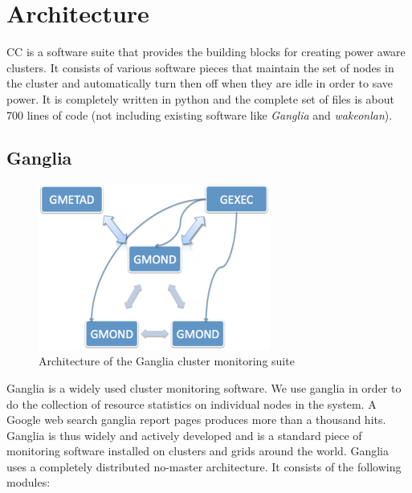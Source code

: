 \section{Architecture} %
\label{sec:architecture}
CC is a software suite that provides the building blocks for creating power aware clusters. It consists of various software pieces that maintain the set of nodes in the cluster and automatically turn then off when they are idle in order to save power. It is completely written in python and the complete set of files is about 700 lines of code (not including existing software like \emph{Ganglia} and \emph{wakeonlan}).

\subsection{Ganglia} %
\label{sub:ganglia}
\begin{figure}[ht]
\centering
\begin{center}
\includegraphics[width=3.0in]{graphs/ganglia-arch.pdf}
\vspace{-0.1in}
\caption{{\normalsize Architecture of the Ganglia cluster monitoring suite}\label{fig:ganglia-arch}}
\vspace{-0.1in}
\end{center}
\end{figure}
Ganglia is a widely used cluster monitoring software. We use ganglia in order to do the collection of resource statistics on individual nodes in the system. A Google web search ganglia report pages produces more than a thousand hits. Ganglia is thus widely and actively developed and is a standard piece of monitoring software installed on clusters and grids around the world. Ganglia uses a completely distributed no-master architecture. It consists of the following modules:
